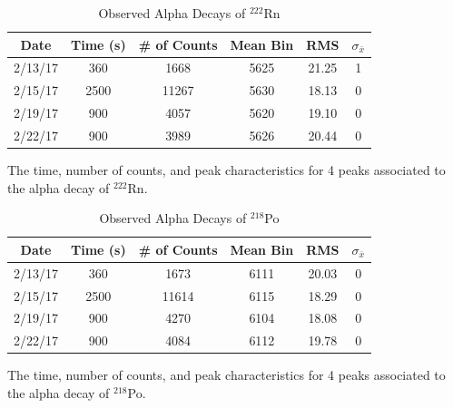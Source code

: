 \documentclass[10pt]{IEEEtran}
\begin{document}
    \begin{table}[!h]
        \begin{center}
        \caption{Observed Alpha Decays of $^{222}$Rn}
        \label{tab:rn222}
        \begin{tabular}{|c|c|c|c|c|c|}
            \hline
            Date & Time (s) & \# of Counts & Mean Bin & RMS & $\sigma_{\bar{x}}$ \\
            \hline
            2/13/17 & 360 & 1668 & 5625 & 21.25 & 1 \\
            \hline
            2/15/17 & 2500 & 11267 & 5630 & 18.13 & 0 \\
            \hline
            2/19/17 & 900 & 4057 & 5620 & 19.10 & 0 \\
            \hline
            2/22/17 & 900 & 3989 & 5626 & 20.44 & 0 \\
            \hline
        \end{tabular}
        \end{center}
        The time, number of counts, and peak characteristics for 4 peaks associated to the alpha decay of $^{222}$Rn.
    \end{table}
    
    \begin{table}[!h]
        \begin{center}
        \caption{Observed Alpha Decays of $^{218}$Po}
        \label{tab:po218}
        \begin{tabular}{|c|c|c|c|c|c|}
            \hline
            Date & Time (s) & \# of Counts & Mean Bin & RMS & $\sigma_{\bar{x}}$ \\
            \hline
            2/13/17 & 360 & 1673 & 6111 & 20.03 & 0 \\
            \hline
            2/15/17 & 2500 & 11614 & 6115 & 18.29 & 0 \\
            \hline
            2/19/17 & 900 & 4270 & 6104 & 18.08 & 0 \\
            \hline
            2/22/17 & 900 & 4084 & 6112 & 19.78 & 0 \\
            \hline
        \end{tabular}
        \end{center}
        The time, number of counts, and peak characteristics for 4 peaks associated to the alpha decay of $^{218}$Po.
    \end{table}
    
\end{document}
